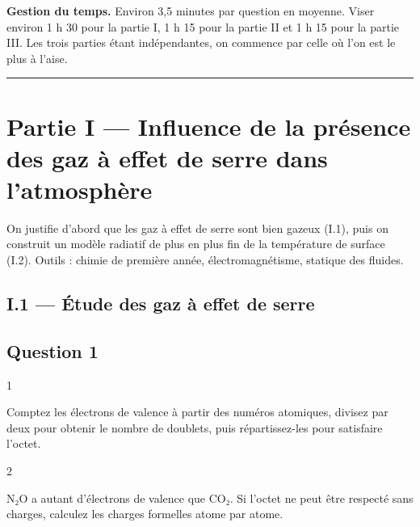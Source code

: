 \documentclass[11pt,a4paper]{article}
\begin{document}
\textbf{Gestion du temps.} Environ 3,5 minutes par question en moyenne. Viser environ 1 h 30 pour la partie I, 1 h 15 pour la partie II et 1 h 15 pour la partie III. Les trois parties étant indépendantes, on commence par celle où l'on est le plus à l'aise.

\begin{center}\rule{0.5\linewidth}{0.5pt}\end{center}

\hypertarget{partie-i-influence-de-la-pruxe9sence-des-gaz-uxe0-effet-de-serre-dans-latmosphuxe8re}{%
\section{Partie I --- Influence de la présence des gaz à effet de serre dans l'atmosphère}\label{partie-i-influence-de-la-pruxe9sence-des-gaz-uxe0-effet-de-serre-dans-latmosphuxe8re}}

On justifie d'abord que les gaz à effet de serre sont bien gazeux (I.1), puis on construit un modèle radiatif de plus en plus fin de la température de surface (I.2). Outils : chimie de première année, électromagnétisme, statique des fluides.

\hypertarget{i.1-uxe9tude-des-gaz-uxe0-effet-de-serre}{%
\subsection{I.1 --- Étude des gaz à effet de serre}\label{i.1-uxe9tude-des-gaz-uxe0-effet-de-serre}}

\hypertarget{question-1}{%
\subsection{Question 1}\label{question-1}}

\begin{indication}{1}

Comptez les électrons de valence à partir des numéros atomiques, divisez par deux pour obtenir le nombre de doublets, puis répartissez-les pour satisfaire l'octet.

\end{indication}

\begin{indication}{2}

N₂O a autant d'électrons de valence que CO₂. Si l'octet ne peut être respecté sans charges, calculez les charges formelles atome par atome.

\end{indication}
\end{document}
